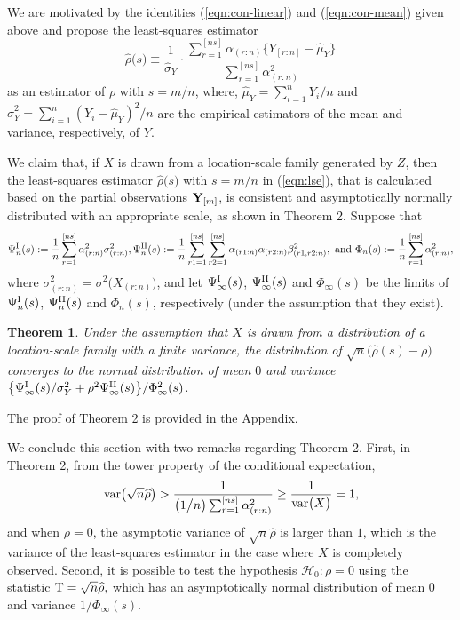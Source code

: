\documentclass[12pt]{article}
\newtheorem{theorem}{Theorem}
\begin{document}
We are motivated by the identities (\ref{eqn:con-linear}) and (\ref{eqn:con-mean}) given above and
propose the least-squares estimator 
\begin{equation} \label{eqn:lse}
\widehat{\rho} \big(s \big) \equiv \frac{1}{\widehat{\sigma}_Y} \cdot
 \frac{\sum_{r=1}^{[ns]} \alpha_{(r:n)}\big\{  Y_{[r:n]} -\widehat{\mu}_Y  \big\}}
{\sum_{r=1}^{[ns]} \alpha_{(r:n)}^2 }
\end{equation}
as an estimator of $\rho$ with $s=m/n$, where, $\widehat{\mu}_Y=\sum_{i=1}^nY_i/n$ and $\widehat{\sigma}_Y^2=\sum_{i=1}^n(Y_i-\widehat{\mu}_Y)^2/n$
are the empirical estimators of the mean and variance, respectively, of $Y$. 


We claim that, if 
$X$ is drawn from a location-scale family generated by $Z$, then the least-squares estimator 
$ \widehat{\rho} \big(s \big)$ with $s=m/n$ in (\ref{eqn:lse}), that is calculated
based on the partial observations ${\bf Y}_{[m]}$,
is consistent and asymptotically normally distributed with an appropriate scale, 
as shown in Theorem 2. Suppose that
\begin{equation} \nonumber
\Psi_n^{\rm I}(s) := \frac{1}{n} \sum_{r=1}^{[ns]} \alpha_{(r:n)}^2 \sigma_{(r:n)}^2, 
\Psi_n^{\rm II}(s):= \frac{1}{n} \sum_{r1=1}^{[ns]} \sum_{r2=1}^{[ns]} \alpha_{(r1:n)}
 \alpha_{(r2:n)}\beta_{(r1,r2:n)}^2,~ \mbox{and}~ \Phi_n(s):=  \frac{1}{n} \sum_{r=1}^{[ns]}
 \alpha_{(r:n)}^2,
\end{equation}
where $\sigma_{(r:n)}^2=
\sigma^2\big(X_{(r:n)} \big)$, and let $\Psi_{\infty}^{\rm I}(s)$, $\Psi_{\infty}^{\rm II}(s)$ and $\Phi_{\infty}(s)$ be the limits of 
 $\Psi_n^{\rm I}(s)$, $\Psi_n^{\rm II}(s)$ and $\Phi_n(s)$, respectively (under the assumption that they exist). 

\begin{theorem}
Under the assumption that $X$ is drawn from a distribution of a location-scale family with a finite variance,
the distribution of $\sqrt{n} \big( \widehat{\rho} (s) -\rho \big) $ converges to the normal distribution of
 mean $0$ and variance $\big\{\Psi_{\infty}^{\rm I}(s)/\sigma_Y^2+\rho^2\Psi_{\infty}^{\rm II}(s)\big\}/\Phi_{\infty}^2(s)$.
\end{theorem}
\noindent The proof of Theorem 2 is provided in the Appendix.


We conclude this section with two remarks regarding Theorem 2. First, in Theorem 2, 
from the tower property of the conditional expectation, 
\begin{equation}\nonumber
{\rm var}\big(\sqrt{n} \widehat{\rho} \big) > \frac{1}{ \big(1 \big/ n \big) \sum_{r=1}^{[ns]}
 \alpha_{(r:n)}^2} \ge \frac{1}{{\rm var} \big(X \big)}=1,
\end{equation}
and when $\rho=0$, the asymptotic variance of $\sqrt{n} \widehat{\rho}$ is larger than $1$,
which is the variance of the least-squares estimator in the case where $X$ is completely observed. Second, 
it is possible to test the hypothesis $\mathcal{H}_0:\rho=0$ using the statistic 
$
{\rm T}= \sqrt{n}  \widehat{\rho},
$
which has an asymptotically normal distribution of mean $0$ and variance $1\big/\Phi_{\infty}(s)$.
\end{document}
